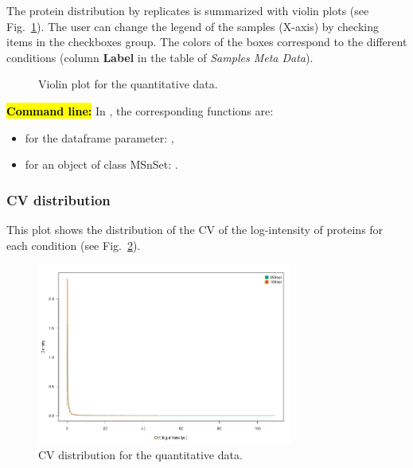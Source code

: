\documentclass[12pt]{article}
\begin{document}
The protein distribution by replicates is summarized with violin plots 
(see Fig.~\ref{fig:violinplot}). The user can change the legend of the samples 
(X-axis) by checking items in the checkboxes group. The colors of the boxes 
correspond to the different conditions (column \textbf{Label} in the table of 
\emph {Samples Meta Data}).

\begin {figure}
\centering
{}
\caption{Violin plot for the quantitative data.}\label{fig:violinplot}
\end {figure}



\hl{\bf Command line:} In , the corresponding functions are:
\begin{itemize}
\item for the dataframe parameter: ,
\item for an object of class MSnSet: .
\end{itemize}




\subsubsection{CV distribution}
This plot shows the distribution of the CV of the log-intensity of 
proteins for each condition (see Fig.~\ref{fig:sdvd}).

\begin {figure}
\centering
\includegraphics[width=0.75\textwidth]{images/desc_CVDist.png}
\caption{CV distribution for the quantitative data.}\label{fig:sdvd}
\end {figure}
\end{document}
